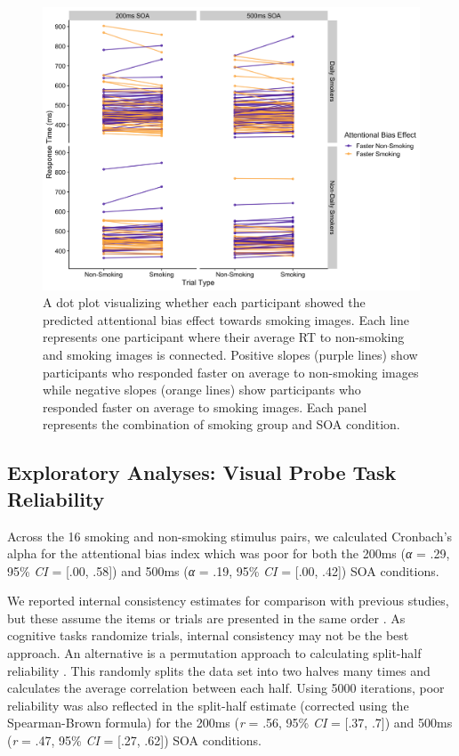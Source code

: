 \documentclass[empirical, authordate, issue]{jote-new-article}
\begin{document}
\begin{figure}[t]

  \begin{fullwidth}
    \includegraphics[width=\linewidth]{media/image5.jpeg}
    \caption{
      A dot plot visualizing whether each participant showed the predicted attentional bias effect towards smoking images. Each line represents one participant where their average RT to non-smoking and smoking images is connected. Positive slopes (purple lines) show participants who responded faster on average to non-smoking images while negative slopes (orange lines) show participants who responded faster on average to smoking images. Each panel represents the combination of smoking group and SOA condition.
    }
    \label{fig:5}
  \end{fullwidth}


\end{figure}


\subsection{Exploratory Analyses: Visual Probe Task Reliability}

Across the 16 smoking and non-smoking stimulus pairs, we calculated Cronbach's alpha for the attentional bias index which was poor for both the 200ms (\emph{α} = .29, 95\% \emph{CI} = [.00, .58]) and 500ms (\emph{α} = .19, 95\% \emph{CI} = [.00, .42]) SOA conditions.

We reported internal consistency estimates for comparison with previous studies, but these assume the items or trials are presented in the same order \parencite{Parsons2019}. As cognitive tasks randomize trials, internal consistency may not be the best approach. An alternative is a permutation approach to calculating split-half reliability \parencite{Parsons2020}. This randomly splits the data set into two halves many times and calculates the average correlation between each half. Using 5000 iterations, poor reliability was also reflected in the split-half estimate (corrected using the Spearman-Brown formula) for the 200ms (\emph{r} = .56, 95\% \emph{CI} = [.37, .7]) and 500ms (\emph{r} = .47, 95\% \emph{CI} = [.27, .62]) SOA conditions.
\end{document}
